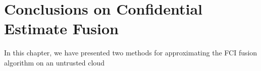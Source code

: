 % 
%                                               
%                                               
%                                               
% 

\section{Conclusions on Confidential Estimate Fusion}\label{sec:cloud_fusion:conclusion}
In this chapter, we have presented two methods for approximating the FCI fusion algorithm on an untrusted cloud 



